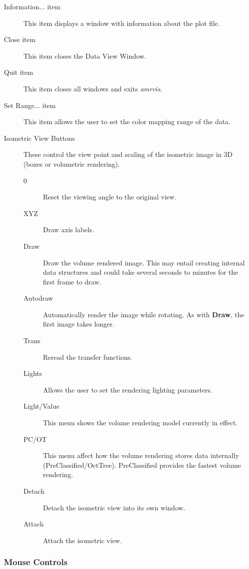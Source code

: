 \documentclass{article}
\begin{document}
\begin{description}
\item[Information... item]  This item displays a window with information
about the plot file.

\item[Close item]  This item closes the Data View Window.

\item[Quit item]  This item closes all windows and exits {\em amrvis}.

\item[Set Range... item]  This item allows the user to set the color
mapping range of the data.

\item [Isometric View Buttons]  These control the view point and scaling
of the isometric image in 3D (boxes or volumetric rendering).

\begin{description}
    \item [0]           Reset the viewing angle to the original view.
    \item [XYZ]         Draw axis labels.
    \item [Draw]        Draw the volume rendered image.  This may entail
		        creating internal data structures and could take
		        several seconds to minutes for the first frame
			to draw.
    \item [Autodraw]    Automatically render the image while rotating.
			As with {\bf Draw}, the first image takes longer.
    \item [Trans]       Reread the transfer functions.
    \item [Lights]      Allows the user to set the rendering lighting parameters.
    \item[Light/Value]  This menu shows the volume rendering
                        model currently in effect.
    \item[PC/OT]        This menu affect how the volume rendering
                        stores data internally (PreClassified/OctTree).
			PreClassified provides the fastest volume rendering.
    \item [Detach]      Detach the isometric view into its own window.
    \item [Attach]      Attach the isometric view.
\end{description}

\end{description}


\subsubsection{Mouse Controls}
\end{document}
